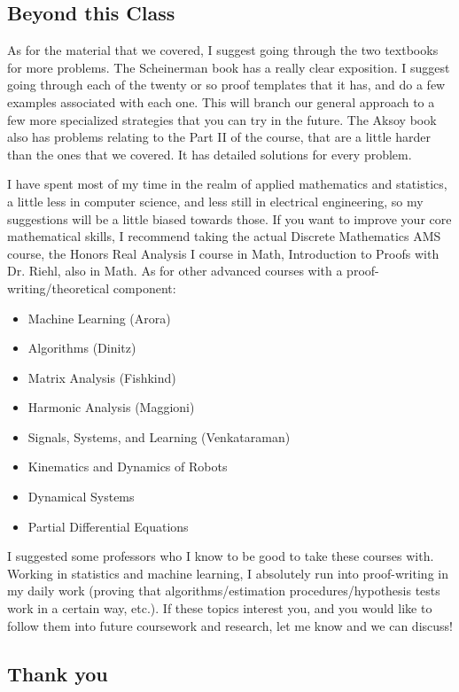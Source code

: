 \documentclass[11pt]{article}
\theoremstyle{plain}
\theoremstyle{definition}
\theoremstyle{remark}
\begin{document}
\subsection*{Beyond this Class}

As for the material that we covered, I suggest going through the two textbooks for more problems. The Scheinerman book has a really clear exposition. I suggest going through each of the twenty or so proof templates that it has, and do a few examples associated with each one. This will branch our general approach to a few more specialized strategies that you can try in the future. The Aksoy book also has problems relating to the Part II of the course, that are a little harder than the ones that we covered. It has detailed solutions for every problem.

I have spent most of my time in the realm of applied mathematics and statistics, a little less in computer science, and less still in electrical engineering, so my suggestions will be a little biased towards those. If you want to improve your core mathematical skills, I recommend taking the actual Discrete Mathematics AMS course, the Honors Real Analysis I course in Math, Introduction to Proofs with Dr. Riehl, also in Math. As for other advanced courses with a proof-writing/theoretical component: 
\begin{itemize}
    \item Machine Learning (Arora)
    \item Algorithms (Dinitz)
    \item Matrix Analysis (Fishkind)
    \item Harmonic Analysis (Maggioni)
    \item Signals, Systems, and Learning (Venkataraman)
    \item Kinematics and Dynamics of Robots
    \item Dynamical Systems
    \item Partial Differential Equations
\end{itemize}
I suggested some professors who I know to be good to take these courses with. Working in statistics and machine learning, I absolutely run into proof-writing in my daily work (proving that algorithms/estimation procedures/hypothesis tests work in a certain way, etc.). If these topics interest you, and you would like to follow them into future coursework and research, let me know and we can discuss!

\subsection*{Thank you}
\end{document}
